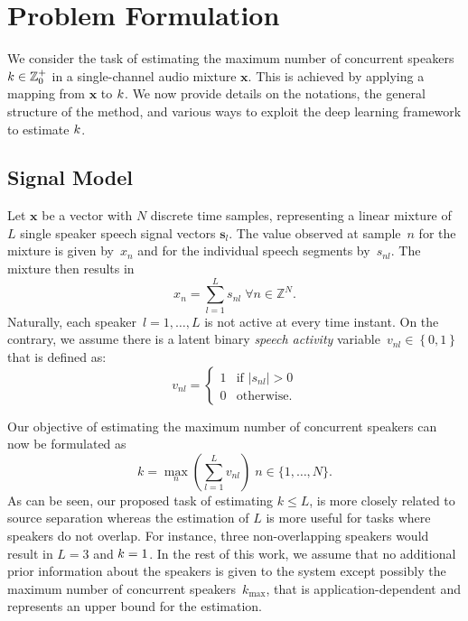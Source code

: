 
\section{Problem Formulation}%
\label{sec:problem_formulation}
We consider the task of estimating the maximum number of concurrent speakers \( k \in \mathbb{Z}^{+}_{0} \) in a single-channel audio mixture \(\mathbf{x}\).
This is achieved by applying a mapping from \(\mathbf{x}\) to \(k \).
We now provide details on the notations, the general structure of the method, and various ways to exploit the deep learning framework to estimate \(k \).

\subsection{Signal Model}%
\label{ssec:signal_model}
Let \(\mathbf{x}\) be a vector with \(N\) discrete time samples, representing a linear mixture of \(L\) single speaker speech signal vectors \(\mathbf{s}_l\).
The value observed at sample~\(n\) for the mixture is given by~$x_n$ and for the individual speech segments by~$s_{nl}$.
The mixture then results in
%
\begin{equation}
  x_n = \sum_{l=1}^{L}{s_{nl}} \; \forall n \in \mathbb{Z}^N.
  \label{eq:mixing_model}
\end{equation}
%
Naturally, each speaker~$l=1,\dots,L$ is not active at every time instant.
On the contrary, we assume there is a latent binary \textit{speech activity} variable~$v_{nl}\in \left\{ 0,1 \right\}$ that is defined as:
\begin{equation}
v_{nl}=\begin{cases}
1 & \text{if }\left|s_{nl}\right|>0\\
0 & \text{otherwise}.
\end{cases}\label{eq:definition_speech_activity}
\end{equation}

Our objective of estimating the maximum number of concurrent speakers can now be formulated as
%
\begin{equation}
k=\underset{n}{\max}\left(\sum_{l = 1}^{L} v_{nl}\right) \; n \in \{ 1,\ldots, N \}
\label{eq:definition_k}.
\end{equation}
%
As can be seen, our proposed task of estimating $k\leq L$, is more closely related to source separation whereas the estimation of \(L\) is more useful for tasks where speakers do not overlap.
For instance, three non-overlapping speakers would result in \(L = 3\) and \(k = 1\).
In the rest of this work, we assume that no additional prior information about the speakers is given to the system except possibly the maximum number of concurrent speakers~$k_{\max}$, that is application-dependent and represents an upper bound for the estimation.

